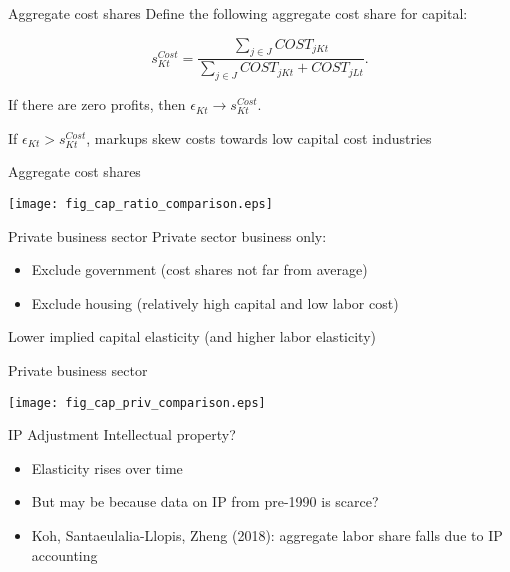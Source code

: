 \documentclass[10pt,xcolor=dvipsnames]{beamer}
\begin{document}
\begin{frame}{Aggregate cost shares}
Define the following aggregate cost share for capital:

\begin{equation}
  s^{Cost}_{Kt} = \frac{\sum_{j \in J} COST_{jKt}}{\sum_{j \in J} COST_{jKt} + COST_{jLt}}. \label{EQ_scost}
\end{equation}

If there are zero profits, then $\epsilon_{Kt} \rightarrow s^{Cost}_{Kt}$. 

\vspace{.25in}

If $\epsilon_{Kt} > s^{Cost}_{Kt}$, markups skew costs towards low capital cost industries

\end{frame}

\begin{frame}{Aggregate cost shares}
\begin{center}
\texttt{[image: fig\_cap\_ratio\_comparison.eps]}
\end{center}
\end{frame}


\begin{frame}{Private business sector}
Private sector business only:
\begin{itemize}
   \item Exclude government (cost shares not far from average)
   \item Exclude housing (relatively high capital and low labor cost)
\end{itemize} 

Lower implied capital elasticity (and higher labor elasticity)

\end{frame}

\begin{frame}{Private business sector}
\begin{center}
\texttt{[image: fig\_cap\_priv\_comparison.eps]}
\end{center}
\end{frame}


\begin{frame}{IP Adjustment}\label{Sip}
Intellectual property?

\begin{itemize}
  \item Elasticity rises over time
  \item But may be because data on IP from pre-1990 is scarce?
  \item Koh, Santaeulalia-Llopis, Zheng (2018): aggregate labor share falls due to IP accounting
\end{itemize}
\vspace{.25in} \hfill \hyperlink{Aip}{}
\end{frame}
\end{document}
